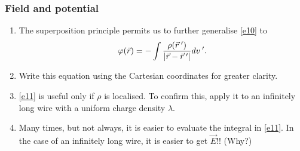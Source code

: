 \documentclass{beamer}
\begin{document}
\begin{frame}
\frametitle{Field and potential}
\begin{enumerate}
\item The superposition principle permits us to further generalise \eqref{e10} to
\begin{equation}\label{e11}
\varphi(\vec{r}) = -\int\frac{\rho(\vec{r}^{\;\prime})}{|\vec{r} - \vec{r}^{\;\prime}|}dv^{\;\prime}.
\end{equation}
\item Write this equation using the Cartesian coordinates for greater clarity.
\item \eqref{e11} is useful only if $\rho$ is localised. To confirm this, apply it
to an infinitely long wire with a uniform charge density $\lambda$.
\item Many times, but not always, it is easier to evaluate the integral in \eqref{e11}.
In the case of an infinitely long wire, it is easier to get $\vec{E}$!! (Why?)

\end{enumerate}
\end{frame}
\end{document}
